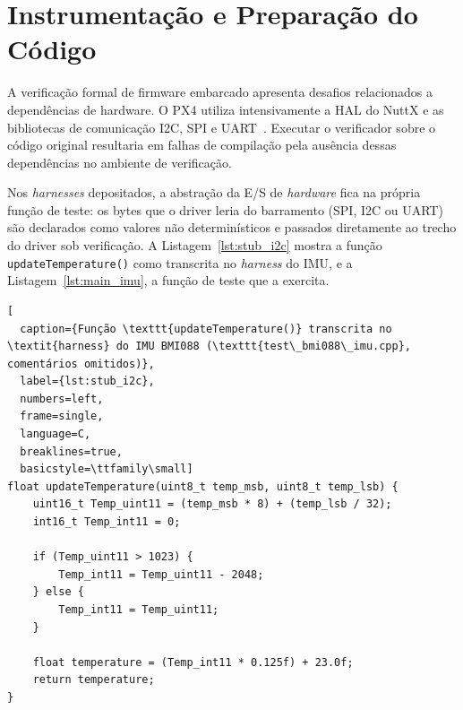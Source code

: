 \section{Instrumentação e Preparação do Código}
\label{sec:instrumentacao}

A verificação formal de firmware embarcado apresenta desafios relacionados a
dependências de hardware. O PX4 utiliza intensivamente a HAL do NuttX e as bibliotecas de comunicação I2C, SPI e UART~\cite{PX4_Documentation}. Executar o verificador sobre o código original resultaria em falhas de compilação pela ausência dessas dependências no ambiente de verificação.


Nos \textit{harnesses} depositados, a abstração da E/S de
\textit{hardware} fica na própria função de teste: os bytes que o driver leria do
barramento (SPI, I2C ou UART) são declarados como valores não determinísticos e
passados diretamente ao trecho do driver sob verificação. A
Listagem~\ref{lst:stub_i2c} mostra a função \texttt{updateTemperature()} como
transcrita no \textit{harness} do IMU, e a Listagem~\ref{lst:main_imu}, a função
de teste que a exercita.


\begin{lstlisting}[
  caption={Função \texttt{updateTemperature()} transcrita no \textit{harness} do IMU BMI088 (\texttt{test\_bmi088\_imu.cpp}, comentários omitidos)},
  label={lst:stub_i2c},
  numbers=left,
  frame=single,
  language=C,
  breaklines=true,
  basicstyle=\ttfamily\small]
float updateTemperature(uint8_t temp_msb, uint8_t temp_lsb) {
    uint16_t Temp_uint11 = (temp_msb * 8) + (temp_lsb / 32);
    int16_t Temp_int11 = 0;

    if (Temp_uint11 > 1023) {
        Temp_int11 = Temp_uint11 - 2048;
    } else {
        Temp_int11 = Temp_uint11;
    }

    float temperature = (Temp_int11 * 0.125f) + 23.0f;
    return temperature;
}
\end{lstlisting}

